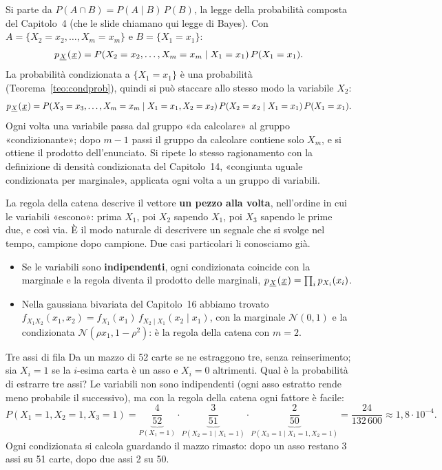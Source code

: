 \begin{dimostrazione}
 Si parte da $P(A \cap B) = P(A \mid B)\, P(B)$, la legge della probabilità composta del
Capitolo~4 (che le slide chiamano qui legge di Bayes). Con $A = \{X_2 = x_2, \ldots, X_m = x_m\}$ e
$B = \{X_1 = x_1\}$:
\[ p_{{\mkern1mu\underline{X}\mkern1mu}}({\mkern1mu\underline{x}\mkern1mu}) = P(X_2 = x_2, \ldots, X_m = x_m \mid X_1 = x_1)\, P(X_1 = x_1) . \]
 La probabilità condizionata a $\{X_1 = x_1\}$ è una probabilità
(Teorema~\ref{teo:condprob}), quindi si può staccare allo stesso modo la variabile $X_2$:
\[ p_{{\mkern1mu\underline{X}\mkern1mu}}({\mkern1mu\underline{x}\mkern1mu}) = P(X_3 = x_3, \ldots, X_m = x_m \mid X_1 = x_1, X_2 = x_2)\, P(X_2 = x_2 \mid X_1 = x_1)\,
   P(X_1 = x_1) . \]
 Ogni volta una variabile passa dal gruppo «da calcolare» al gruppo «condizionante»; dopo $m - 1$ passi
il gruppo da calcolare contiene solo $X_m$, e si ottiene il prodotto dell'enunciato.
 Si ripete lo stesso ragionamento con la definizione di densità condizionata del Capitolo~14,
«congiunta uguale condizionata per marginale», applicata ogni volta a un gruppo di variabili.
\end{dimostrazione}

La regola della catena descrive il vettore \textbf{un pezzo alla volta}, nell'ordine in cui le variabili «escono»:
prima $X_1$, poi $X_2$ sapendo $X_1$, poi $X_3$ sapendo le prime due, e così via. È il modo naturale di descrivere un
segnale che si svolge nel tempo, campione dopo campione. Due casi particolari li conosciamo già.
\begin{itemize}
  \item Se le variabili sono \textbf{indipendenti}, ogni condizionata coincide con la marginale e la regola diventa il
        prodotto delle marginali, $p_{{\mkern1mu\underline{X}\mkern1mu}}({\mkern1mu\underline{x}\mkern1mu}) = \prod_i p_{X_i}(x_i)$.
  \item Nella gaussiana bivariata del Capitolo~16 abbiamo trovato $f_{X_1 X_2}(x_1, x_2) = f_{X_1}(x_1)\,
        f_{X_2 \mid X_1}(x_2 \mid x_1)$, con la marginale $\mathcal{N}(0, 1)$ e la condizionata
        $\mathcal{N}(\rho x_1, 1 - \rho^2)$: è la regola della catena con $m = 2$.
\end{itemize}

\begin{esempio}{Tre assi di fila}
Da un mazzo di 52 carte se ne estraggono tre, senza reinserimento; sia $X_i = 1$ se la $i$-esima carta è un asso e
$X_i = 0$ altrimenti. Qual è la probabilità di estrarre tre assi? Le variabili non sono indipendenti (ogni asso estratto
rende meno probabile il successivo), ma con la regola della catena ogni fattore è facile:
\[ P(X_1 = 1, X_2 = 1, X_3 = 1) = \underbrace{\frac{4}{52}}_{P(X_1 = 1)} \cdot \underbrace{\frac{3}{51}}_{P(X_2 = 1
   \mid X_1 = 1)} \cdot \underbrace{\frac{2}{50}}_{P(X_3 = 1 \mid X_1 = 1, X_2 = 1)} = \frac{24}{132\,600} \approx
   1{,}8 \cdot 10^{-4} . \]
Ogni condizionata si calcola guardando il mazzo rimasto: dopo un asso restano 3 assi su 51 carte, dopo due assi 2 su 50.
\end{esempio}

